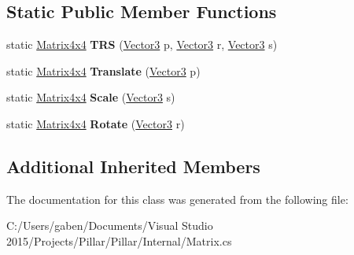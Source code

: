 \subsection*{Static Public Member Functions}
\begin{DoxyCompactItemize}
\item 
\mbox{\label{class_pillar3_d_1_1_matrix4x4_a73c342bee53918b131125ebf3f9ae959}} 
static \hyperlink{class_pillar3_d_1_1_matrix4x4}{Matrix4x4} {\bfseries T\+RS} (\hyperlink{class_pillar3_d_1_1_vector3}{Vector3} p, \hyperlink{class_pillar3_d_1_1_vector3}{Vector3} r, \hyperlink{class_pillar3_d_1_1_vector3}{Vector3} s)
\item 
\mbox{\label{class_pillar3_d_1_1_matrix4x4_abc63327bd6ff4c432b84ca59b8cf05bf}} 
static \hyperlink{class_pillar3_d_1_1_matrix4x4}{Matrix4x4} {\bfseries Translate} (\hyperlink{class_pillar3_d_1_1_vector3}{Vector3} p)
\item 
\mbox{\label{class_pillar3_d_1_1_matrix4x4_a211bfd081ec7c8bd2d38a47179696dba}} 
static \hyperlink{class_pillar3_d_1_1_matrix4x4}{Matrix4x4} {\bfseries Scale} (\hyperlink{class_pillar3_d_1_1_vector3}{Vector3} s)
\item 
\mbox{\label{class_pillar3_d_1_1_matrix4x4_a65de40c4ca95d8a724af0dee8a6a2bae}} 
static \hyperlink{class_pillar3_d_1_1_matrix4x4}{Matrix4x4} {\bfseries Rotate} (\hyperlink{class_pillar3_d_1_1_vector3}{Vector3} r)
\end{DoxyCompactItemize}
\subsection*{Additional Inherited Members}


The documentation for this class was generated from the following file\+:\begin{DoxyCompactItemize}
\item 
C\+:/\+Users/gaben/\+Documents/\+Visual Studio 2015/\+Projects/\+Pillar/\+Pillar/\+Internal/Matrix.\+cs\end{DoxyCompactItemize}
